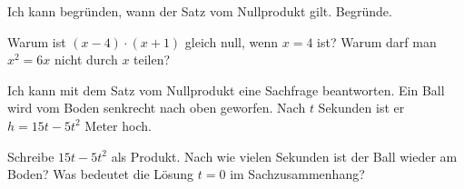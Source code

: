 \begin{aufgabe}{Ich kann begründen, wann der Satz vom Nullprodukt gilt.}
Begründe.
\begin{teile}
\teil Warum ist $(x - 4) \cdot (x + 1)$ gleich null, wenn $x = 4$ ist?
\teil Warum darf man $x^2 = 6x$ nicht durch $x$ teilen?
\end{teile}
\end{aufgabe}

\begin{aufgabe}{Ich kann mit dem Satz vom Nullprodukt eine Sachfrage beantworten.}
Ein Ball wird vom Boden senkrecht nach oben geworfen. Nach $t$ Sekunden ist er $h = 15t - 5t^2$ Meter hoch.
\begin{teile}
\teil Schreibe $15t - 5t^2$ als Produkt.
\teil Nach wie vielen Sekunden ist der Ball wieder am Boden?
\teil Was bedeutet die Lösung $t = 0$ im Sachzusammenhang?
\end{teile}
\end{aufgabe}
